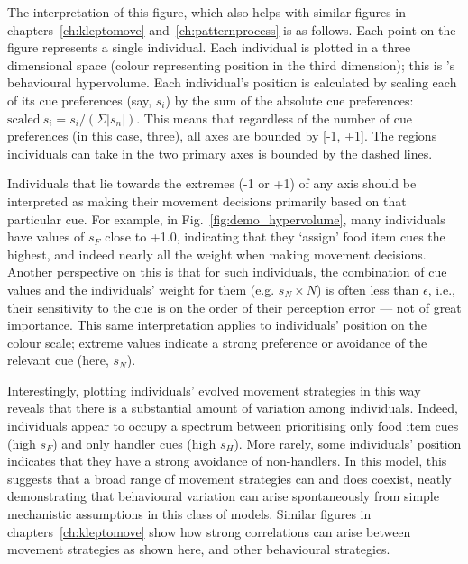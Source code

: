 \begin{interludeenv}
The interpretation of this figure, which also helps with similar figures in chapters~\ref{ch:kleptomove} and~\ref{ch:patternprocess} is as follows.
Each point on the figure represents a single individual.
Each individual is plotted in a three dimensional space (colour representing position in the third dimension); this is \textcite{bastille-rousseau2019}'s behavioural hypervolume.
Each individual's position is calculated by scaling each of its cue preferences (say, $s_i$) by the sum of the absolute cue preferences: $\text{scaled}~s_i = s_i / (\Sigma |s_n|)$.
This means that regardless of the number of cue preferences (in this case, three), all axes are bounded by [-1, +1].
The regions individuals can take in the two primary axes is bounded by the dashed lines.

Individuals that lie towards the extremes (-1 or +1) of any axis should be interpreted as making their movement decisions primarily based on that particular cue.
For example, in Fig.~\ref{fig:demo_hypervolume}, many individuals have values of $s_F$ close to +1.0, indicating that they `assign' food item cues the highest, and indeed nearly all the weight when making movement decisions.
Another perspective on this is that for such individuals, the combination of cue values and the individuals' weight for them (e.g. $s_N \times N$) is often less than $\epsilon$, i.e., their sensitivity to the cue is on the order of their perception error --- not of great importance.
This same interpretation applies to individuals' position on the colour scale; extreme values indicate a strong preference or avoidance of the relevant cue (here, $s_N$).

Interestingly, plotting individuals' evolved movement strategies in this way reveals that there is a substantial amount of variation among individuals.
Indeed, individuals appear to occupy a spectrum between prioritising only food item cues (high $s_F$) and only handler cues (high $s_H$).
More rarely, some individuals' position indicates that they have a strong avoidance of non-handlers.
In this model, this suggests that a broad range of movement strategies can and does coexist, neatly demonstrating that behavioural variation can arise spontaneously from simple mechanistic assumptions in this class of models.
Similar figures in chapters~\ref{ch:kleptomove} show how strong correlations can arise between movement strategies as shown here, and other behavioural strategies.



\end{interludeenv}
